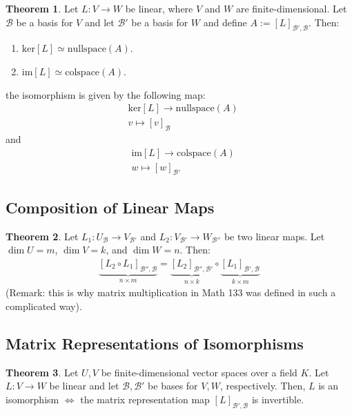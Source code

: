 \documentclass[11pt]{scrartcl}
\theoremstyle{definition}
\newtheorem{theorem}{Theorem}
\theoremstyle{remark}
\newcommand{\kernel}[1]{\text{ker}[#1]}
\newcommand{\image}[1]{\text{im}[#1]}
\begin{document}
\begin{theorem}
	Let $L: V \rightarrow W$ be linear, where $V$ and $W$ are finite-dimensional. Let $\mathcal{B}$ be a basis for $V$ and let $\mathcal{B}'$ be a basis for $W$ and define $A := [L]_{\mathcal{B', B}}$. Then: 
	\begin{enumerate}[noitemsep]
		\item $\kernel{L} \simeq \text{nullspace}(A)$.
		\item $\image{L} \simeq \text{colspace}(A)$. 
	\end{enumerate} 
	the isomorphism is given by the following map: 
	\begin{align}
		& \kernel{L} \rightarrow \text{nullspace}(A) \\
		& v \mapsto [v]_\mathcal{B} 	
	\end{align}
	and 
	\begin{align}
		& \image{L} \rightarrow \text{colspace}(A) \\
		& w \mapsto [w]_{\mathcal{B}'} 	
	\end{align}
\end{theorem}

\subsection{Composition of Linear Maps}
\begin{theorem}
	Let $L_1: U_\mathcal{B} \rightarrow V_{\mathcal{B}'} $ and $L_2: V_{\mathcal{B'}} \rightarrow W_{\mathcal{B''}}$ be two linear maps. Let $\dim{U} = m$, $\dim{V} = k$, and $\dim{W} = n$. Then: 
	\begin{align}
		\underbrace{[L_2 \circ L_1]_{\mathcal{B'', B}}}_{n \times m} = \underbrace{[L_2]_{\mathcal{B'', B'}}}_{n \times k} \circ \underbrace{[L_1]_{\mathcal{B', B}}}_{k \times m} 	
	\end{align}
	(Remark: this is why matrix multiplication in Math 133 was defined in such a complicated way). 
\end{theorem}

\subsection{Matrix Representations of Isomorphisms}
\begin{theorem}
	Let $U, V$ be finite-dimensional vector spaces over a field $K$. Let $L: V \rightarrow W$ be linear and let $\mathcal{B}, \mathcal{B'}$ be bases for $V, W$, respectively. Then, $L$ is an isomorphism $\iff$ the matrix representation map $[L]_{\mathcal{B}', \mathcal{B}}$ is invertible. 
\end{theorem}
\end{document}
